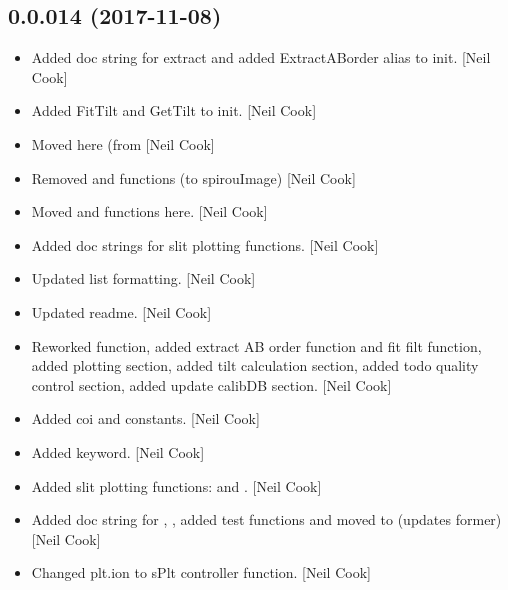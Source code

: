 \documentclass[a4paper,10pt,english]{report}
\begin{document}
\subsection{0.0.014 (2017-11-08)}
\label{\detokenize{misc/changelog:id536}}\begin{itemize}
\item {} 
Added doc string for extract and added ExtractABorder alias to init.
{[}Neil Cook{]}

\item {} 
Added FitTilt and GetTilt to init. {[}Neil Cook{]}

\item {} 
Moved  here (from  {[}Neil Cook{]}

\item {} 
Removed  and  functions (to spirouImage) {[}Neil Cook{]}

\item {} 
Moved  and  functions here. {[}Neil Cook{]}

\item {} 
Added doc strings for slit plotting functions. {[}Neil Cook{]}

\item {} 
Updated  list formatting. {[}Neil Cook{]}

\item {} 
Updated readme. {[}Neil Cook{]}

\item {} 
Reworked  function, added extract AB order function and fit
filt function, added plotting section, added tilt calculation section,
added todo quality control section, added update calibDB section.
{[}Neil Cook{]}

\item {} 
Added coi  and  constants. {[}Neil Cook{]}

\item {} 
Added  keyword. {[}Neil Cook{]}

\item {} 
Added slit plotting functions:  and
. {[}Neil Cook{]}

\item {} 
Added doc string for , , added test
functions  and moved  to
 (updates former) {[}Neil Cook{]}

\item {} 
Changed plt.ion to sPlt controller function. {[}Neil Cook{]}

\end{itemize}
\end{document}
